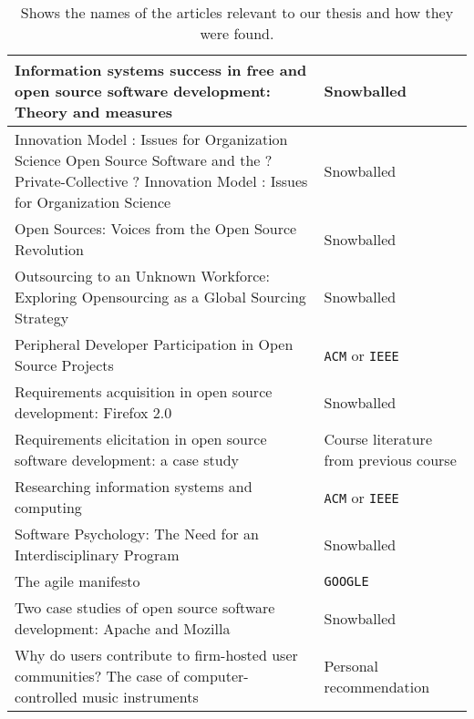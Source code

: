\documentclass[11pt, oneside]{article}   	%
\begin{document}
\begin{table}[!h]
\begin{tabular}{  p{}  p{} }
		Information systems success in free and open source software development: Theory and measures	& Snowballed	\\\hline
		Innovation Model : Issues for Organization Science Open Source Software and the ? Private-Collective ? Innovation Model : Issues for Organization Science	& Snowballed	\\\hline
		Open Sources: Voices from the Open Source Revolution	& Snowballed	\\\hline
		Outsourcing to an Unknown Workforce: Exploring Opensourcing as a Global Sourcing Strategy	& Snowballed	\\\hline
		Peripheral Developer Participation in Open Source Projects	& \texttt{ACM} or \texttt{IEEE}	\\\hline
		Requirements acquisition in open source development: Firefox 2.0	& Snowballed	\\\hline
		Requirements elicitation in open source software development: a case study	& Course literature from previous course	\\\hline
		Researching information systems and computing	& \texttt{ACM} or \texttt{IEEE}	\\\hline
		Software Psychology: The Need for an Interdisciplinary Program	& Snowballed	\\\hline
		The agile manifesto	& \texttt{GOOGLE}	\\\hline
		Two case studies of open source software development: Apache and Mozilla	& Snowballed	\\\hline
		Why do users contribute to firm-hosted user communities? The case of computer-controlled music instruments	& Personal recommendation	\\\hline
	\end{tabular}
	\caption{Shows the names of the articles relevant to our thesis and how they were found.}
	\label{tab:relevant}
\end{table}
\end{document}
